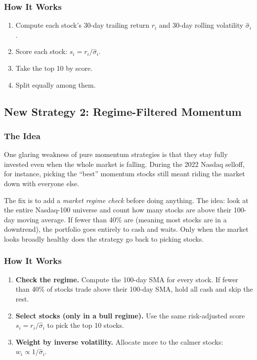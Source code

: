 \documentclass[11pt,a4paper]{article}
\begin{document}
\subsubsection{How It Works}
\begin{enumerate}[leftmargin=*]
    \item Compute each stock's 30-day trailing return $r_i$ and
          30-day rolling volatility $\hat{\sigma}_i$.
    \item Score each stock: $s_i = r_i / \hat{\sigma}_i$.
    \item Take the top 10 by score.
    \item Split equally among them.
\end{enumerate}

\subsection{New Strategy 2: Regime-Filtered Momentum}

\subsubsection{The Idea}

One glaring weakness of pure momentum strategies is that they stay fully invested
even when the whole market is falling.
During the 2022 Nasdaq selloff, for instance, picking the ``best'' momentum stocks
still meant riding the market down with everyone else.

The fix is to add a \emph{market regime check} before doing anything.
The idea: look at the entire Nasdaq-100 universe and count how many stocks are above
their 100-day moving average.
If fewer than 40\% are (meaning most stocks are in a downtrend), the portfolio goes
entirely to cash and waits.
Only when the market looks broadly healthy does the strategy go back to picking stocks.

\subsubsection{How It Works}
\begin{enumerate}[leftmargin=*]
    \item \textbf{Check the regime.}
          Compute the 100-day SMA for every stock.
          If fewer than 40\% of stocks trade above their 100-day SMA, hold all cash
          and skip the rest.
    \item \textbf{Select stocks (only in a bull regime).}
          Use the same risk-adjusted score $s_i = r_i / \hat{\sigma}_i$ to pick
          the top 10 stocks.
    \item \textbf{Weight by inverse volatility.}
          Allocate more to the calmer stocks: $w_i \propto 1/\hat{\sigma}_i$.
\end{enumerate}
\end{document}
